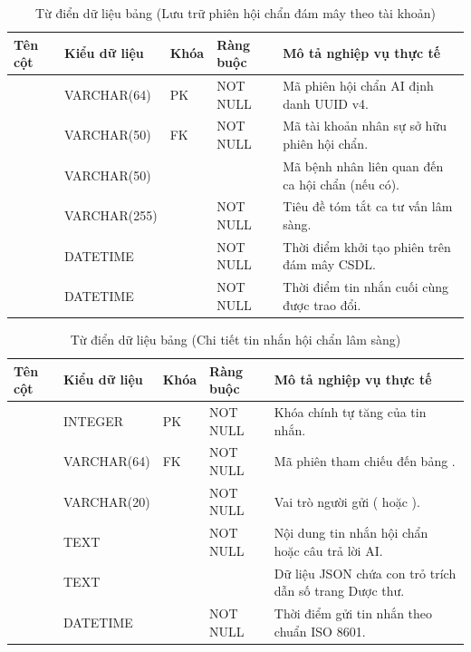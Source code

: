 \begin{table}[htbp]
\centering
\small
\begin{tabularx}{\textwidth}{L{3.5cm} L{2.2cm} C{1.2cm} C{1.8cm} Y}
\toprule
\textbf{Tên cột} & \textbf{Kiểu dữ liệu} & \textbf{Khóa} & \textbf{Ràng buộc} & \textbf{Mô tả nghiệp vụ thực tế} \\
\midrule
{} & VARCHAR(64) & PK & NOT NULL & Mã phiên hội chẩn AI định danh UUID v4. \\
 & VARCHAR(50) & FK & NOT NULL & Mã tài khoản nhân sự sở hữu phiên hội chẩn. \\
 & VARCHAR(50) & & & Mã bệnh nhân liên quan đến ca hội chẩn (nếu có). \\
 & VARCHAR(255) & & NOT NULL & Tiêu đề tóm tắt ca tư vấn lâm sàng. \\
 & DATETIME & & NOT NULL & Thời điểm khởi tạo phiên trên đám mây CSDL. \\
 & DATETIME & & NOT NULL & Thời điểm tin nhắn cuối cùng được trao đổi. \\
\bottomrule
\end{tabularx}
\caption{Từ điển dữ liệu bảng  (Lưu trữ phiên hội chẩn đám mây theo tài khoản)}
\end{table}

\begin{table}[htbp]
\centering
\small
\begin{tabularx}{\textwidth}{L{3.5cm} L{2.2cm} C{1.2cm} C{1.8cm} Y}
\toprule
\textbf{Tên cột} & \textbf{Kiểu dữ liệu} & \textbf{Khóa} & \textbf{Ràng buộc} & \textbf{Mô tả nghiệp vụ thực tế} \\
\midrule
{} & INTEGER & PK & NOT NULL & Khóa chính tự tăng của tin nhắn. \\
 & VARCHAR(64) & FK & NOT NULL & Mã phiên tham chiếu đến bảng . \\
 & VARCHAR(20) & & NOT NULL & Vai trò người gửi ( hoặc ). \\
 & TEXT & & NOT NULL & Nội dung tin nhắn hội chẩn hoặc câu trả lời AI. \\
 & TEXT & & & Dữ liệu JSON chứa con trỏ trích dẫn số trang Dược thư. \\
 & DATETIME & & NOT NULL & Thời điểm gửi tin nhắn theo chuẩn ISO 8601. \\
\bottomrule
\end{tabularx}
\caption{Từ điển dữ liệu bảng  (Chi tiết tin nhắn hội chẩn lâm sàng)}
\end{table}

